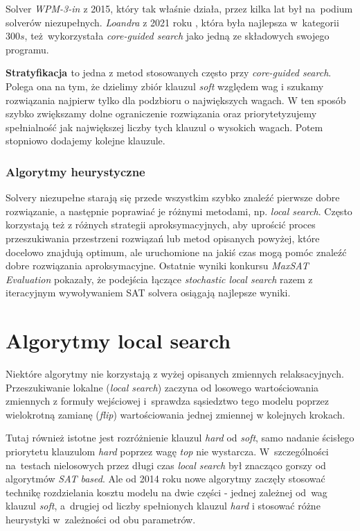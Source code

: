 \documentclass[shortabstract]{iithesis}
\begin{document}
Solver \textit{WPM-3-in \cite{wpm3-in}} z 2015, który tak właśnie działa, przez kilka lat był na~podium solverów niezupełnych. 
\textit{Loandra} z 2021 roku \cite{coreboosted}, która była najlepsza w~kategorii $300s$, też wykorzystała \textit{core-guided search} jako jedną ze składowych swojego programu.

\textbf{Stratyfikacja \cite{stratification}} to jedna z metod stosowanych często przy \textit{core-guided search}. Polega ona na tym, że dzielimy zbiór klauzul \textit{soft} względem wag i szukamy rozwiązania najpierw tylko dla podzbioru o największych wagach. W ten sposób szybko zwiększamy dolne ograniczenie rozwiązania oraz priorytetyzujemy spełnialność jak największej liczby tych klauzul o wysokich wagach. Potem stopniowo dodajemy kolejne klauzule.

\subsubsection{Algorytmy heurystyczne}
Solvery niezupełne starają się przede wszystkim szybko znaleźć pierwsze dobre rozwiązanie, a następnie poprawiać je różnymi metodami, np. \textit{local search}. Często korzystają też z różnych strategii aproksymacyjnych, aby uprościć proces przeszukiwania przestrzeni rozwiązań lub metod opisanych powyżej, które docelowo znajdują optimum, ale uruchomione na jakiś czas mogą pomóc znaleźć dobre rozwiązania aproksymacyjne.
Ostatnie wyniki konkursu \textit{MaxSAT Evaluation} pokazały, że podejścia łączące \textit{stochastic local search} razem z iteracyjnym wywoływaniem SAT solvera osiągają najlepsze wyniki.

\section{Algorytmy local search}
Niektóre algorytmy nie korzystają z wyżej opisanych zmiennych relaksacyjnych. Przeszukiwanie lokalne (\textit{local search}) zaczyna od losowego wartościowania zmiennych z formuły wejściowej i~sprawdza sąsiedztwo tego modelu poprzez wielokrotną zamianę (\textit{flip}) wartościowania jednej zmiennej w kolejnych krokach.

Tutaj również istotne jest rozróżnienie klauzul \textit{hard} od \textit{soft}, samo nadanie ścisłego priorytetu klauzulom \textit{hard} poprzez wagę \textit{top} nie wystarcza. W~szczególności na~testach nielosowych przez długi czas \textit{local search} był znacząco gorszy od algorytmów \textit{SAT based}. Ale od 2014 roku nowe algorytmy zaczęły stosować technikę rozdzielania kosztu modelu na dwie części - jednej zależnej od~wag klauzul \textit{soft}, a~drugiej od liczby spełnionych klauzul \textit{hard} i stosować różne heurystyki w~zależności od obu parametrów.
\end{document}
